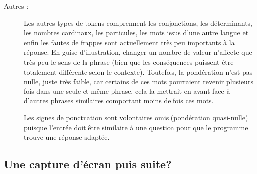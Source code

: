 \begin{description}
  \item[Autres :] Les autres types de tokens comprennent les conjonctions, les déterminants, les nombres cardinaux, les particules, les mots issus d'une autre langue et enfin les fautes de frappes sont actuellement très peu importants à la réponse. En guise d'illustration, changer un nombre de valeur n'affecte que très peu le sens de la phrase (bien que les conséquences puissent être totalement différente selon le contexte). Toutefois, la pondération n'est pas nulle, juste très faible, car certains de ces mots pourraient revenir plusieurs fois dans une seule et même phrase, cela la mettrait en avant face à d'autres phrases similaires comportant moins de fois ces mots.

  Les signes de ponctuation sont volontaires omis (pondération quasi-nulle) puisque l'entrée doit être similaire à une question pour que le programme trouve une réponse adaptée.
\end{description}

\subsection{Une capture d'écran puis suite?}